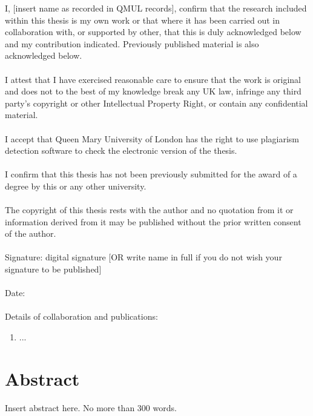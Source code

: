\documentclass[a4paper, twoside]{report} %
\begin{document}
    I, [insert name as recorded in QMUL records], confirm that the research included within this thesis is my own work or that where it has been carried out in collaboration with, or supported by other, that this is duly acknowledged below and my contribution indicated. Previously published material is also acknowledged below. \\ \\
    \noindent I attest that I have exercised reasonable care to ensure that the work is original and does not to the best of my knowledge break any UK law, infringe any third party’s copyright or other Intellectual Property Right, or contain any confidential material. \\ \\    
    \noindent  I accept that Queen Mary University of London has the right to use plagiarism detection software to check the electronic version of the thesis. \\ \\    
    \noindent I confirm that this thesis has not been previously submitted for the award of a degree by this or any other university. \\ \\
    \noindent The copyright of this thesis rests with the author and no quotation from it or information derived from it may be published without the prior written consent of the author. \\ \\
    \noindent Signature: digital signature [OR write name in full if you do not wish your signature to be published] \\ \\    
    \noindent Date:\\ \\    
    \noindent Details of collaboration and publications:\\
    \begin{enumerate}
    \@ 
    \item  ...
    \end{enumerate}


\newpage
\chapter*{Abstract}
Insert abstract here. No more than 300 words.
\end{document}
